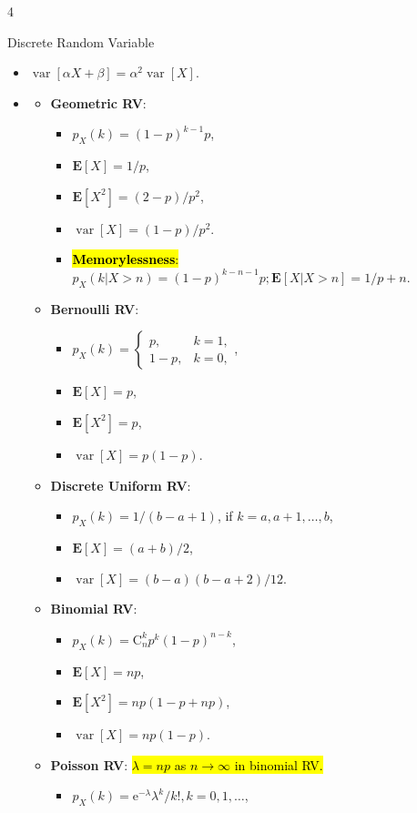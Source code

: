 \documentclass[landscape,a4paper]{article}
\renewcommand{\emph}[1]{\hl{#1}}
\newcommand{\e}{\mathrm{e}}
\newcommand{\C}[2]{\mathrm{C}_{#1}^{#2}}
\newcommand{\EE}{\mathbf{E}}
\newcommand{\var}{\operatorname{var}}
\begin{document}
\begin{multicols*}{4}
\begin{card}{Discrete Random Variable}
\begin{itemize}
				\item $\var[\alpha X+\beta]=\alpha^2\var[X]$.
				\item \begin{itemize}
					\item \textbf{Geometric RV}:
					\begin{itemize}
						\item $p_X(k)=(1-p)^{k-1}p$,
						\item $\EE[X]=1/p$,
						\item $\EE[X^2]=(2-p)/p^2$,
						\item $\var[X]=(1-p)/p^2$.
						\item \emph{\textbf{Memorylessness}:}\\ $p_X(k|X>n)=(1-p)^{k-n-1}p;\EE[X|X > n]=1/p + n$.
					\end{itemize}
					\item \textbf{Bernoulli RV}:
					\begin{itemize}
						\item $p_X(k)=\begin{cases}p,&k=1,\\1-p,&k=0,\end{cases}$,
						\item $\EE[X]=p$,
						\item $\EE[X^2]=p$,
						\item $\var[X]=p(1-p)$.
					\end{itemize}
					\item \textbf{Discrete Uniform RV}:
					\begin{itemize}
						\item $p_X(k)=1/(b-a+1)$, if $k=a,a+1,\dots,b$,
						\item $\EE[X]=(a+b)/2$,
						\item $\var[X]=(b-a)(b-a+2)/12$.
					\end{itemize}
					\item \textbf{Binomial RV}:
					\begin{itemize}
						\item $p_X(k)=\C{n}{k}p^k(1-p)^{n-k}$,
						\item $\EE[X]=np$,
						\item $\EE[X^2]=np(1-p+np)$,
						\item $\var[X]=np(1-p)$.
					\end{itemize}
					\item \textbf{Poisson RV}: \emph{$\lambda=np$ as $n\to\infty$ in binomial RV.}
					\begin{itemize}
						\item $p_X(k)=\e^{-\lambda}\lambda^k/k!,k=0,1,\dots$,

\end{itemize}
\end{itemize}
\end{itemize}
\end{card}
\end{multicols*}
\end{document}
